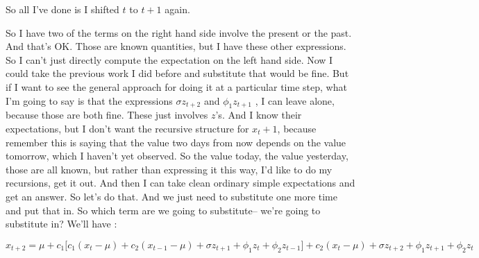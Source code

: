 \documentclass{article}
\begin{document}
So all I've done is I shifted $t$ to $t+1$ again.


So I have two of the terms on the right hand side
involve the present or the past.
And that's OK.
Those are known quantities, but I have these other expressions.
So I can't just directly compute the expectation
on the left hand side.
Now I could take the previous work I did before
and substitute that would be fine.
But if I want to see the general approach for doing it
at a particular time step, what I'm going to say
is that the expressions  $\sigma z_{t+2}$ and $\phi_1 z_{t+1}$ , I can leave alone,
because those are both fine.
These just involves $z$'s.
And I know their expectations, but I
don't want the recursive structure for $x_t+1$, because remember this is saying that the value two
days from now depends on the value tomorrow, which
I haven't yet observed.
So the value today, the value yesterday, those are all known,
but rather than expressing it this way,
I'd like to do my recursions, get it out.
And then I can take clean ordinary simple expectations
and get an answer.
So let's do that.
And we just need to substitute one more time and put that in.
So which term are we going to substitute--
we're going to substitute in?
We'll have :

$$ x_{t+2} = \mu + c_1\Big[  c_1(x_{t}-\mu) + c_2(x_{t-1}-\mu) + \sigma z_{t+1} + \phi_1 z_{t} + \phi_2 z_{t-1} \Big] + c_2(x_{t}-\mu) + \sigma z_{t+2} + \phi_1 z_{t+1} + \phi_2 z_{t} $$
\end{document}
